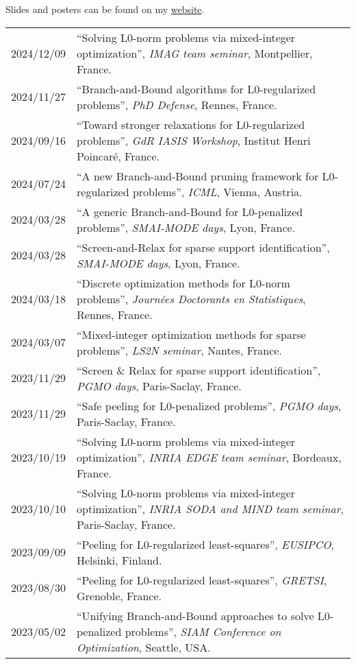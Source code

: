 Slides and posters can be found on my \href{https://theoguyard.github.io/talks}{website}.

\begin{longtable}[l]{@{}p{}p{}}
    2024/12/09 & ``Solving L0-norm problems via mixed-integer optimization'', \textit{IMAG team seminar}, Montpellier, France. \\
    2024/11/27 & ``Branch-and-Bound algorithms for L0-regularized problems'', \textit{PhD Defense}, Rennes, France. \\
    2024/09/16 & ``Toward stronger relaxations for L0-regularized problems'', \textit{GdR IASIS Workshop}, Institut Henri Poincaré, France. \\
    2024/07/24 & ``A new Branch-and-Bound pruning framework for L0-regularized problems'', \textit{ICML}, Vienna, Austria. \\
    2024/03/28 & ``A generic Branch-and-Bound for L0-penalized problems'', \textit{SMAI-MODE days}, Lyon, France. \\
    2024/03/28 & ``Screen-and-Relax for sparse support identification'', \textit{SMAI-MODE days}, Lyon, France. \\
    2024/03/18 & ``Discrete optimization methods for L0-norm problems'', \textit{Journées Doctorants en Statistiques}, Rennes, France. \\
    2024/03/07 & ``Mixed-integer optimization methods for sparse problems'', \textit{LS2N seminar}, Nantes, France. \\
    2023/11/29 & ``Screen \& Relax for sparse support identification'', \textit{PGMO days}, Paris-Saclay, France. \\
    2023/11/29 & ``Safe peeling for L0-penalized problems'', \textit{PGMO days}, Paris-Saclay, France. \\
    2023/10/19 & ``Solving L0-norm problems via mixed-integer optimization'', \textit{INRIA EDGE team seminar}, Bordeaux, France. \\
    2023/10/10 & ``Solving L0-norm problems via mixed-integer optimization'', \textit{INRIA SODA and MIND team seminar}, Paris-Saclay, France. \\
    2023/09/09 & ``Peeling for L0-regularized least-squares'', \textit{EUSIPCO}, Helsinki, Finland. \\
    2023/08/30 & ``Peeling for L0-regularized least-squares'', \textit{GRETSI}, Grenoble, France. \\
    2023/05/02 & ``Unifying Branch-and-Bound approaches to solve L0-penalized problems'', \textit{SIAM Conference on Optimization}, Seattle, USA. \\

\end{longtable}
